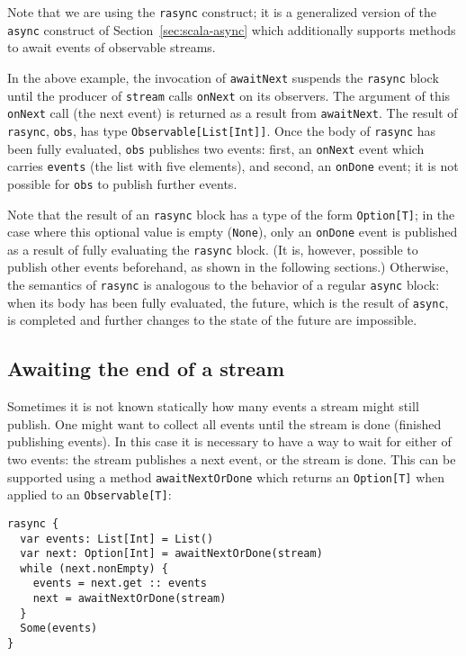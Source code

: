 \documentclass{acm_proc_article-sp}
\begin{document}
Note that we are using the \verb|rasync| construct; it is a generalized
version of the \verb|async| construct of Section~\ref{sec:scala-async} which
additionally supports methods to await events of observable streams.

In the above example, the invocation of \verb|awaitNext| suspends the
\verb|rasync| block until the producer of \verb|stream| calls \verb|onNext| on
its observers. The argument of this \verb|onNext| call (the next event) is
returned as a result from \verb|awaitNext|. The result of \verb|rasync|,
\verb|obs|, has type \verb|Observable[List[Int]]|. Once the body of
\verb|rasync| has been fully evaluated, \verb|obs| publishes two events:
first, an \verb|onNext| event which carries \verb|events| (the list with five
elements), and second, an \verb|onDone| event; it is not possible for
\verb|obs| to publish further events.

Note that the result of an \verb|rasync| block has a type of the form
\verb|Option[T]|; in the case where this optional value is empty
(\verb|None|), only an \verb|onDone| event is published as a result of fully
evaluating the \verb|rasync| block. (It is, however, possible to publish other
events beforehand, as shown in the following sections.) Otherwise, the
semantics of \verb|rasync| is analogous to the behavior of a regular
\verb|async| block: when its body has been fully evaluated, the future, which
is the result of \verb|async|, is completed and further changes to the state
of the future are impossible.


\subsection{Awaiting the end of a stream}

Sometimes it is not known statically how many events a stream might still
publish. One might want to collect all events until the stream is done
(finished publishing events). In this case it is necessary to have a way to
wait for either of two events: the stream publishes a next event, or the
stream is done. This can be supported using a method \verb|awaitNextOrDone|
which returns an \verb|Option[T]| when applied to an \verb|Observable[T]|:

\begin{lstlisting}
rasync {
  var events: List[Int] = List()
  var next: Option[Int] = awaitNextOrDone(stream)
  while (next.nonEmpty) {
    events = next.get :: events
    next = awaitNextOrDone(stream)
  }
  Some(events)
}
\end{lstlisting}
\end{document}
